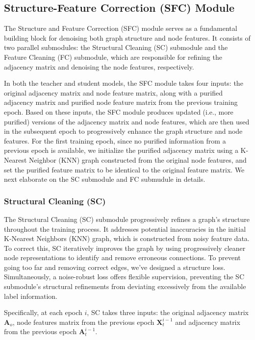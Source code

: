 \documentclass[sigconf, anonymous, review]{acmart}
\begin{document}
  \subsection{Structure-Feature Correction (SFC) Module}\label{sec:sfc}
    The Structure and Feature Correction (SFC) module serves as a fundamental building block for denoising both graph structure and node features. It consists of two parallel submodules: the Structural Cleaning (SC) submodule and the Feature Cleaning (FC) submodule, which are responsible for refining the adjacency matrix and denoising the node features, respectively.

    In both the teacher and student models, the SFC module takes four inputs: the original adjacency matrix and node feature matrix, along with a purified adjacency matrix and purified node feature matrix from the previous training epoch. Based on these inputs, the SFC module produces updated (i.e., more purified) versions of the adjacency matrix and node features, which are then used in the subsequent epoch to progressively enhance the graph structure and node features. For the first training epoch, since no purified information from a previous epoch is available, we initialize the purified adjacency matrix using a K-Nearest Neighbor (KNN) graph constructed from the original node features, and set the purified feature matrix to be identical to the original feature matrix. We next elaborate on the SC submodule and FC submudule in details.

    \subsubsection{Structural Cleaning (SC)}
      The Structural Cleaning (SC) submodule progressively refines a graph's structure throughout the training process. 
      It addresses potential inaccuracies in the initial K-Nearest Neighbors (KNN) graph, which is constructed from noisy feature data. To correct this, SC iteratively improves the graph by using progressively cleaner node representations to identify and remove erroneous connections. To prevent going too far and removing correct edges, we've designed a structure loss. Simultaneously, a noise-robust loss offers flexible supervision, preventing the SC submodule's structural refinements from deviating excessively from the available label information.
      
      Specifically, at each epoch $i$, SC takes three inputs: the original adjacency matrix $\mathbf{A}_o$, node features matrix from the previous epoch  $\mathbf{X}_t^{i-1}$ and adjacency matrix from the previous epoch  $\mathbf{A}_t^{i-1}$.
\end{document}
